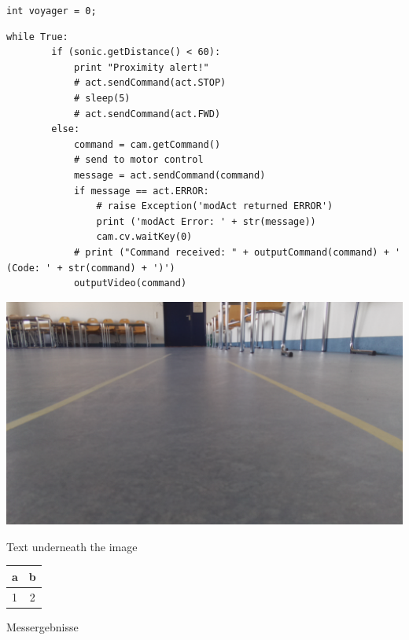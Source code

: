 \documentclass[a4paper,10pt]{article}
\begin{document}

    \lstinline{int voyager = 0;}

    \begin{lstlisting}[style=pythonStyle,label=python-02,caption=Python-Code]
    while True:
        if (sonic.getDistance() < 60):
            print "Proximity alert!"
            # act.sendCommand(act.STOP)
            # sleep(5)
            # act.sendCommand(act.FWD)
        else:
            command = cam.getCommand()
            # send to motor control
            message = act.sendCommand(command)
            if message == act.ERROR:
                # raise Exception('modAct returned ERROR')
                print ('modAct Error: ' + str(message))
                cam.cv.waitKey(0)
            # print ("Command received: " + outputCommand(command) + ' (Code: ' + str(command) + ')')
            outputVideo(command)
    \end{lstlisting}
 
    \begin{minipage}{\columnwidth}
      \makeatletter
      \def\@captype{figure}
      \makeatother
      \centering
      \includegraphics[width=0.8\linewidth]{images/image.png}
      \caption{Text underneath the image}
      \label{fig:image-01}
    \end{minipage}

    \begin{minipage}{\columnwidth}
      \makeatletter
      \def\@captype{table}
      \makeatother
      \centering
      \begin{tabular}{ l | c }
      a & b \\ \hline \hline
      1 & 2 \\
      \end{tabular}
      \caption{Messergebnisse}
      \label{tab:122}
    \end{minipage}
\end{document}
